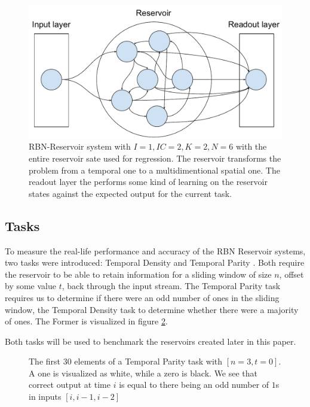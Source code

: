 \begin{figure}
  \centering
  \includegraphics[width=\columnwidth]{background/RBN-Reservoir.pdf}
  \caption{
    RBN-Reservoir system with $I=1, IC=2, K=2, N=6$ with the entire reservoir sate used for regression.
    The reservoir transforms the problem from a temporal one to a multidimentional spatial one.
    The readout layer the performs some kind of learning on the reservoir states against the expected output for the current task.}
  \label{figure:rbn-reservoir}
\end{figure}

\subsection{Tasks}
\label{section:tasks}

To measure the real-life performance and accuracy of the RBN Reservoir systems,
two tasks were introduced: Temporal Density and Temporal Parity \cite{rbn-reservoir}.
Both require the reservoir to be able to retain information for a sliding window of size $ n $,
offset by some value $ t $, back through the input stream.
The Temporal Parity task requires us to determine if there were an odd number of ones in the sliding window,
the Temporal Density task to determine whether there were a majority of ones.
The Former is visualized in figure \ref{figure:temporal-parity}.

Both tasks will be used to benchmark the reservoirs created later in this paper.

\begin{figure}


  \caption{
    The first 30 elements of a Temporal Parity task with $[n=3, t=0]$.
    A one is visualized as white, while a zero is black.
    We see that correct output at time $i$ is equal to there being an odd number of $1$s in inputs $[i, i-1, i-2]$
  }
  \label{figure:temporal-parity}
\end{figure}

